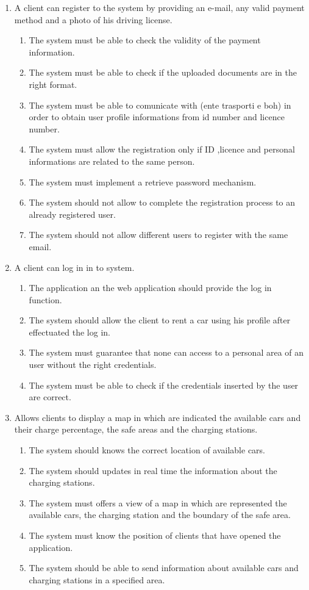\begin{enumerate}
\item A client can register to the system by providing an e-mail, any valid payment method and a photo of his driving license.
\begin{enumerate}
\item The system must be able to check the validity of the payment information.
\item The system must be able to check if the uploaded documents are in the right format.
\item The system must be able to comunicate with (ente trasporti e boh) in order to obtain user profile informations from id number and licence number. %
\item The system must allow the registration only if ID ,licence and personal informations are related to the same person.
\item The system must  implement a retrieve password mechanism.
\item The system should not allow to complete the registration process to an already registered user.
\item The system should not allow different users to register with the same email.
\end{enumerate}

\item A client can log in in to system.
\begin{enumerate}
\item The application an the web application should provide the log in function.
\item The system should allow the client to rent a car using his profile after effectuated the log in.
\item The system must guarantee that none can access to a personal area of an user without the right credentials.
\item The system must be able to check if the credentials inserted by the user are correct.
\end{enumerate}

\item Allows clients to display a map in which are indicated the available cars and their charge percentage, the safe areas and the charging stations.
\begin{enumerate}
\item The system should knows the correct location of available cars.
\item The system should updates in real time the information about the charging stations.
\item The system must offers a view of a map in which are represented the available cars, the charging station and the boundary of the safe area.
\item The system must know the position of clients that have opened the application.
\item The system should be able to send information about available cars and charging stations in a specified area.
\end{enumerate}



\end{enumerate}

